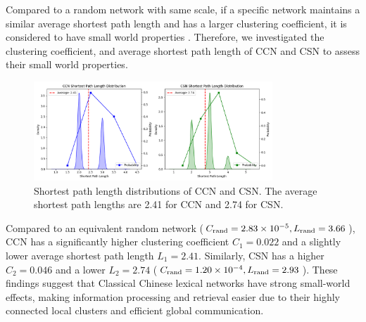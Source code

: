 \documentclass[11pt]{article}
\begin{document}
Compared to a random network with same scale, if a specific network maintains a similar average shortest path length and has a larger clustering coefficient, it is considered to have small world properties \cite{Watts1998}. Therefore, we investigated the clustering coefficient, and average shortest path length of CCN and CSN to assess their small world properties.
\begin{figure}[htbp]
    \centering
    \includegraphics[width=0.8\textwidth]{../analysis/shortest path/shortest path.png}
    \caption{Shortest path length distributions of CCN and CSN. The average shortest path lengths are 2.41 for CCN and 2.74 for CSN.}
    \label{fig:shortest_path}
    \end{figure}
    Compared to an equivalent random network ($C_{\rm rand}=2.83 \times 10^{-5}, L_{\rm rand}=3.66$), CCN has a significantly higher clustering coefficient $C_1=0.022$ and a slightly lower average shortest path length $L_1=2.41$. Similarly, CSN has a higher $C_2=0.046$ and a lower $L_2=2.74$ ($C_{\rm rand}=1.20 \times 10^{-4}, L_{\rm rand}=2.93$). These findings suggest that Classical Chinese lexical networks have strong small-world effects, making information processing and retrieval easier due to their highly connected local clusters and efficient global communication.
\end{document}
